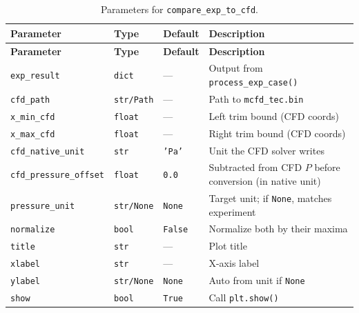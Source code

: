 \documentclass[11pt, letterpaper]{article}
\begin{document}
\begin{longtable}{@{}lllp{5.8cm}@{}}
\caption{Parameters for \texttt{compare\_exp\_to\_cfd}.}
\label{tab:compare_params} \\
\toprule
\textbf{Parameter} & \textbf{Type} & \textbf{Default} & \textbf{Description} \\
\midrule
\endfirsthead
\toprule
\textbf{Parameter} & \textbf{Type} & \textbf{Default} & \textbf{Description} \\
\midrule
\endhead
\texttt{exp\_result}           & \texttt{dict}       & ---           & Output from \texttt{process\_exp\_case()} \\
\texttt{cfd\_path}             & \texttt{str/Path}   & ---           & Path to \texttt{mcfd\_tec.bin} \\
\texttt{x\_min\_cfd}           & \texttt{float}      & ---           & Left trim bound (CFD coords) \\
\texttt{x\_max\_cfd}           & \texttt{float}      & ---           & Right trim bound (CFD coords) \\
\texttt{cfd\_native\_unit}     & \texttt{str}        & \texttt{'Pa'} & Unit the CFD solver writes \\
\texttt{cfd\_pressure\_offset} & \texttt{float}      & \texttt{0.0}  & Subtracted from CFD $P$ before conversion (in native unit) \\
\texttt{pressure\_unit}        & \texttt{str/None}   & \texttt{None} & Target unit; if \texttt{None}, matches experiment \\
\texttt{normalize}             & \texttt{bool}       & \texttt{False}& Normalize both by their maxima \\
\texttt{title}                 & \texttt{str}        & ---           & Plot title \\
\texttt{xlabel}                & \texttt{str}        & ---           & X-axis label \\
\texttt{ylabel}                & \texttt{str/None}   & \texttt{None} & Auto from unit if \texttt{None} \\
\texttt{show}                  & \texttt{bool}       & \texttt{True} & Call \texttt{plt.show()} \\
\bottomrule
\end{longtable}
\end{document}

